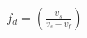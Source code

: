 \documentclass[preview]{standalone}
\begin{document}
\begin{align*}
f_d =\left(\frac{v_s}{v_s-v_f}\right)
\end{align*}
\end{document}
